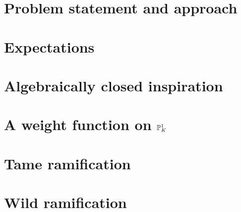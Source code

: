\section{Problem statement and approach} \label{sec:problem_statement}


\section{Expectations} \label{sec:expectations}


\section{Algebraically closed inspiration} \label{sec:algebraically_closed_inspriration}


\section{ A weight function on $\mathbb{P}^{1}_K$} \label{sec:a_weight_function_on_pro_1_k}


\section{Tame ramification} \label{sec:if_mk}


\section{Wild ramification} \label{sec:wild_ramification}



